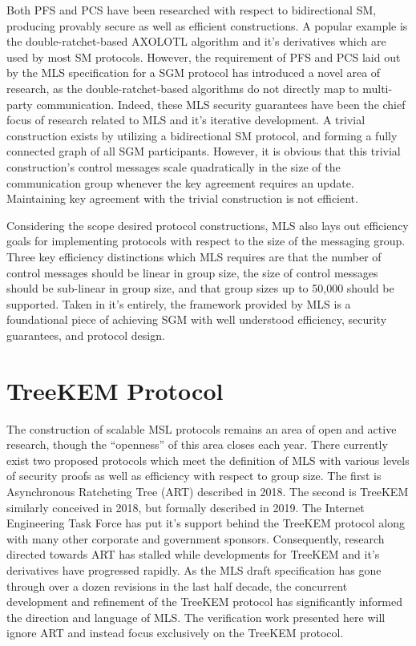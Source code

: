 Both PFS and PCS have been researched with respect to bidirectional SM, producing provably secure as well as efficient constructions.
A popular example is the double-ratchet-based AXOLOTL algorithm \autocite{perrin2014axolotl} and it's derivatives which are used by most SM protocols.
However, the requirement of PFS and PCS laid out by the MLS specification for a SGM protocol has introduced a novel area of research, as the double-ratchet-based algorithms do not directly map to multi-party communication.
Indeed, these MLS security guarantees have been the chief focus of research related to MLS and it's iterative development.
A trivial construction exists by utilizing a bidirectional SM protocol, and forming a fully connected graph of all SGM participants.
However, it is obvious that this trivial construction's control messages scale quadratically in the size of the communication group whenever the key agreement requires an update.
Maintaining key agreement with the trivial construction is not efficient.

Considering the scope desired protocol constructions, MLS also lays out efficiency goals for implementing protocols with respect to the size of the messaging group.
Three key efficiency distinctions which MLS requires are that the number of control messages should be linear in group size, the size of control messages should be sub-linear in group size, and that group sizes up to 50,000 should be supported.
Taken in it's entirely, the framework provided by MLS is a foundational piece of achieving SGM with well understood efficiency, security guarantees, and protocol design.

\hypertarget{treekem-protocol}{%
\section{TreeKEM Protocol}\label{treekem-protocol}}

The construction of scalable MSL protocols remains an area of open and active research, though the ``openness'' of this area closes each year.
There currently exist two proposed protocols which meet the definition of MLS with various levels of security proofs as well as efficiency with respect to group size.
The first is Asynchronous Ratcheting Tree (ART) \autocite{cohn2018ends} described in 2018.
The second is TreeKEM \autocite{bhargavan:hal-02425247} similarly conceived in 2018, but formally described in 2019.
The Internet Engineering Task Force has put it's support behind the TreeKEM protocol along with many other corporate and government sponsors.
Consequently, research directed towards ART has stalled while developments for TreeKEM and it's derivatives have progressed rapidly.
As the MLS draft specification has gone through over a dozen revisions in the last half decade, the concurrent development and refinement of the TreeKEM protocol has significantly informed the direction and language of MLS.
The verification work presented here will ignore ART and instead focus exclusively on the TreeKEM protocol.

